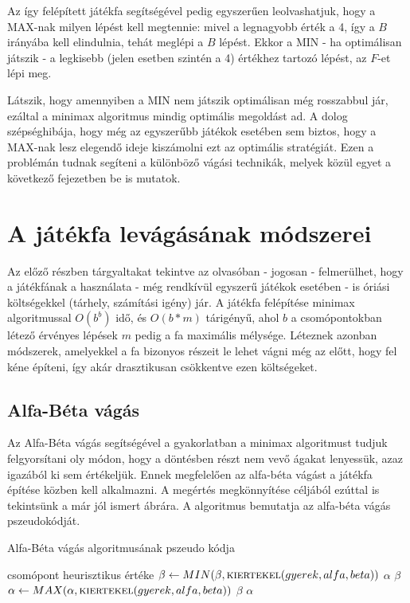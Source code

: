 Az így felépített játékfa segítségével pedig egyszerűen leolvashatjuk, hogy a MAX-nak milyen lépést kell megtennie: mivel a legnagyobb érték a 4, így a $B$ irányába kell elindulnia, tehát meglépi a $B$ lépést. Ekkor a MIN - ha optimálisan játszik - a legkisebb (jelen esetben szintén a 4) értékhez tartozó lépést, az $F$-et lépi meg.\ujsor

Látszik, hogy amennyiben a MIN nem játszik optimálisan még rosszabbul jár, ezáltal a minimax algoritmus mindig optimális megoldást ad. A dolog szépséghibája, hogy még az egyszerűbb játékok esetében sem biztos, hogy a MAX-nak lesz elegendő ideje kiszámolni ezt az optimális stratégiát. Ezen a problémán tudnak segíteni a különböző vágási technikák, melyek közül egyet a következő fejezetben be is mutatok.


\section{A játékfa levágásának módszerei}
Az előző részben tárgyaltakat tekintve az olvasóban - jogosan - felmerülhet, hogy a játékfának a használata - még rendkívül egyszerű játékok esetében - is óriási költségekkel (tárhely, számítási igény) jár. A játékfa felépítése minimax algoritmussal $O(b^b)$ idő, és $O(b*m)$ tárigényű, ahol $b$ a csomópontokban létező érvényes lépések $m$ pedig a fa maximális mélysége. Léteznek azonban módszerek, amelyekkel a fa bizonyos részeit le lehet vágni még az előtt, hogy fel kéne építeni, így akár drasztikusan csökkentve ezen költségeket.

\subsection{Alfa-Béta vágás}
Az Alfa-Béta vágás segítségével a gyakorlatban a minimax algoritmust tudjuk felgyorsítani oly módon, hogy a döntésben részt nem vevő ágakat lenyessük, azaz igazából ki sem értékeljük. Ennek megfelelően az alfa-béta vágást a játékfa építése közben kell alkalmazni. A megértés megkönnyítése céljából ezúttal is tekintsünk a már jól ismert  ábrára. A  algoritmus bemutatja az alfa-béta vágás pszeudokódját.\ujsor

\begin{algorithm}
	\caption{Alfa-Béta vágás algoritmusának pszeudo kódja}
	\label{alg:alfabeta}
	\begin{algorithmic}[1]
		\State \Return csomópont heurisztikus értéke
		\EndIf
		\State $\beta \gets MIN(\beta, \Call{kiertekel}{gyerek, alfa, beta})$
		\If {$\beta <= \alpha$}
		\State \Return $\alpha$
		\EndIf
		\EndFor
		\State \Return $\beta$
		\EndIf		
		\State $\alpha \gets MAX(\alpha, \Call{kiertekel}{gyerek, alfa, beta})$
		\If {$\beta <= \alpha$}
		\State \Return $\beta$
		\EndIf
		\EndFor
		\State \Return $\alpha$
		\EndIf	
		\EndFunction
	\end{algorithmic}
\end{algorithm}


